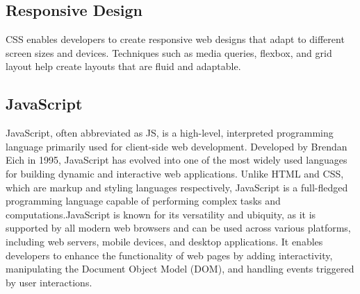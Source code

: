 \subsection*{Responsive Design}  CSS enables developers to create responsive web designs that adapt to different screen sizes and devices. Techniques such as media queries, flexbox, and grid layout help create layouts that are fluid and adaptable.
\subsection{JavaScript}  JavaScript, often abbreviated as JS, is a high-level, interpreted programming language primarily used for client-side web development. Developed by Brendan Eich in 1995, JavaScript has evolved into one of the most widely used languages for building dynamic and interactive web applications. Unlike HTML and CSS, which are markup and styling languages respectively, JavaScript is a full-fledged programming language capable of performing complex tasks and computations.JavaScript is known for its versatility and ubiquity, as it is supported by all modern web browsers and can be used across various platforms, including web servers, mobile devices, and desktop applications. It enables developers to enhance the functionality of web pages by adding interactivity, manipulating the Document Object Model (DOM), and handling events triggered by user interactions.
